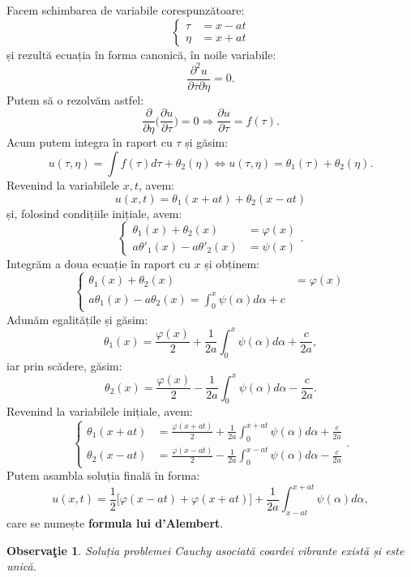 \documentclass[11pt,a4paper]{article}
\theoremstyle{dotless}
\theoremstyle{dotlessdr}
\newtheorem{remark}{Observa\c{t}ie}[section]
\begin{document}
Facem schimbarea de variabile corespunzătoare:
\[
  \begin{cases}
    \tau &= x - at \\
    \eta &= x + at
  \end{cases}
\]
și rezultă ecuația în forma canonică, în noile variabile:
\[
  \frac{\partial^2 u}{\partial \tau \partial \eta} = 0.
\]
Putem să o rezolvăm astfel:
\[
  \frac{\partial}{\partial \eta} \Big( \frac{\partial u}{\partial \tau} \Big) = 0 \Rightarrow %
  \frac{\partial u}{\partial \tau} = f(\tau).
\]
Acum putem integra în raport cu $ \tau $ și găsim:
\[
  u(\tau, \eta) = \int f(\tau) d\tau + \theta_2(\eta) \Leftrightarrow %
  u(\tau, \eta) = \theta_1(\tau) + \theta_2(\eta).
\]
Revenind la variabilele $ x, t $, avem:
\[
  u(x, t) = \theta_1(x + at) + \theta_2(x - at)
\]
și, folosind condițiile inițiale, avem:
\[
  \begin{cases}
    \theta_1(x) + \theta_2(x) &= \varphi(x) \\
    a\theta'_1(x) - a\theta'_2(x) &= \psi(x)
  \end{cases}.
\]
Integrăm a doua ecuație în raport cu $ x $ și obținem:
\[
  \begin{cases}
    \theta_1(x) + \theta_2(x) &= \varphi(x) \\
    a\theta_1(x) - a\theta_2(x) = \int_0^x \psi(\alpha) d\alpha + c
  \end{cases}
\]
Adunăm egalitățile și găsim:
\[
  \theta_1(x) = \frac{\varphi(x)}{2} + \frac{1}{2a} \int_0^x \psi(\alpha) d\alpha + \frac{c}{2a},
\]
iar prin scădere, găsim:
\[
  \theta_2(x) = \frac{\varphi(x)}{2} - \frac{1}{2a} \int_0^x \psi(\alpha) d\alpha - \frac{c}{2a}.
\]
Revenind la variabilele inițiale, avem:
\[
  \begin{cases}
    \theta_1(x + at) &= \frac{\varphi(x + at)}{2} + %
    \frac{1}{2a} \int_0^{x + at} \psi(\alpha) d\alpha + \frac{c}{2a} \\
    \theta_2(x - at) &= \frac{\varphi(x - at)}{2} - %
    \frac{1}{2a} \int_0^{x - at} \psi(\alpha) d\alpha - \frac{c}{2a}
  \end{cases}.
\]
Putem asambla soluția finală în forma:
\begin{equation} \label{eq:dalembert}
  u(x, t) = \frac{1}{2} \big[ \varphi(x - at) + \varphi(x + at) \big] + %
  \frac{1}{2a} \int_{x - at}^{x + at} \psi(\alpha) d\alpha,
\end{equation}
care se numește \textbf{formula lui d'Alembert}.

\begin{remark}\label{rk:ex-unic-coarda}
  Soluția problemei Cauchy asociată coardei vibrante există și este unică.
\end{remark}
\end{document}

